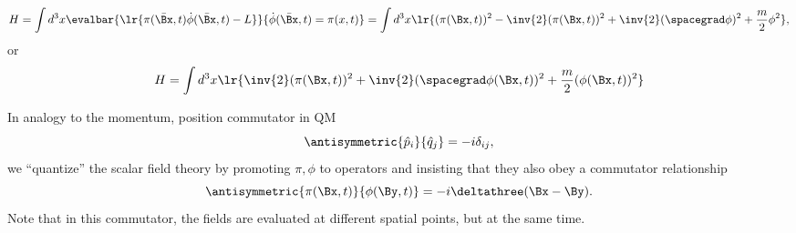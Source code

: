 \begin{dmath}\label{eqn:qftLecture4:940}
H
= \int d^3 x \evalbar{\lr{ \pi(\bar{\Bx}, t) \dot{\phi}(\bar{\Bx}, t) - L }}{\dot{\phi}(\bar{\Bx}, t) = \pi(x, t) }
= \int d^3 x \lr{ (\pi(\Bx, t))^2 - \inv{2} (\pi(\Bx, t))^2 + \inv{2} (\spacegrad \phi)^2 + \frac{m}{2} \phi^2 },
\end{dmath}
or
\begin{dmath}\label{eqn:qftLecture4:960}
H
= \int d^3 x \lr{ \inv{2} (\pi(\Bx, t))^2 + \inv{2} (\spacegrad \phi(\Bx, t))^2 + \frac{m}{2} (\phi(\Bx, t))^2 }
\end{dmath}

In analogy to the momentum, position commutator in QM
\begin{dmath}\label{eqn:qftLecture4:1000}
\antisymmetric{\hat{p}_i}{\hat{q}_j} = -i \delta_{ij},
\end{dmath}
we ``quantize'' the scalar field theory by promoting \( \pi, \phi \) to operators and insisting that they also obey a commutator relationship
\begin{dmath}\label{eqn:qftLecture4:980}
\antisymmetric{\pi(\Bx, t)}{\phi(\By, t)} = -i \deltathree(\Bx - \By).
\end{dmath}
Note that in this commutator, the fields are evaluated at different spatial points, but at the same time.
